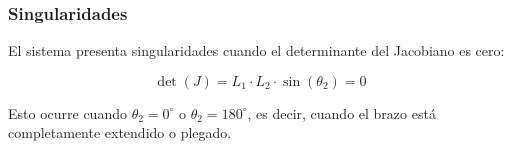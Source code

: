 \subsubsection{Singularidades}

El sistema presenta singularidades cuando el determinante del Jacobiano es cero:

\begin{equation}
    \det(J) = L_1 \cdot L_2 \cdot \sin(\theta_2) = 0
\end{equation}

Esto ocurre cuando \(\theta_2 = 0^\circ \) o \(\theta_2 = 180^\circ\), es decir, cuando el brazo está completamente extendido o plegado.

